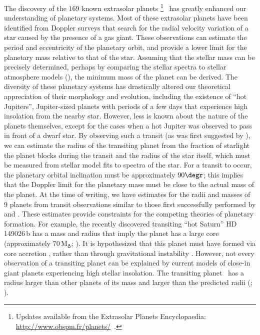 The discovery of the $169$ known extrasolar planets%
\footnote{Updates available from the 
Extrasolar Planets Encyclopaedia:\\
\url{http://www.obspm.fr/planets/}\ .}%
\ has greatly enhanced our
understanding of planetary systems. Most of these extrasolar planets
have been identified from Doppler surveys that search for the radial
velocity variation of a star caused by the presence of a gas giant.
These observations can estimate the period and eccentricity of the
planetary orbit, and provide a lower limit for the planetary mass
relative to that of the star. Assuming that the stellar mass can be
precisely determined, perhaps by comparing the stellar spectra to
stellar atmosphere models (\citealp[such as][]{Kurucz:ATLAS9:1993a}),
the minimum mass of the planet can be derived.  The diversity of these
planetary systems has drastically altered our theoretical appreciation
of their morphology and evolution, including the existence of ``hot
Jupiters'', Jupiter-sized planets with periods of a few days that
experience high insolation from the nearby star.  However, less is
known about the nature of the planets themselves, except for the cases
when a hot Jupiter was observed to pass in front of a dwarf star. By
observing such a transit (as was first suggested by
\citealt{Struve:obs:1952a}), we can estimate the radius of the
transiting planet from the fraction of starlight the planet blocks
during the transit and the radius of the star itself, which must be
measured from stellar model fits to spectra of the star. For a transit
to occur, the planetary orbital inclination must be approximately
$90\degr$; this implies that the Doppler limit for the planetary
mass must be close to the actual mass of the planet. At the 
time of writing, we have estimates for the radii and masses of 9 planets from transit
observations similar to those first successfully performed by
\citet{Charbonneau_Brown_Latham:apjl:2000a} and
\citet{Henry_Marcy_Butler:apj:2000a}. These estimates provide
constraints for the competing theories of planetary formation. For
example, the recently discovered transiting ``hot Saturn''
\mbox{HD\,149026\,b} has a mass and radius that imply the
planet has a large core (approximately $70\,\mathrm{M}_{\earth}$;
\citealt{Sato_Fischer_Henry:apj:2005a, Charbonneau_Winn_Latham:apj:2006a}).
It is hypothesized that this planet must have formed via core
accretion \citep{Pollack:araa:1984a, Pollack_Hubickyj_Bodenheimer:icarus:1996a},
rather than through gravitational instability \citep{Boss:sc:1997a}.
However, not every observation of a transiting planet can be explained
by current models of close-in giant planets experiencing high stellar
insolation. The transiting planet \hdTZNb\ has a radius larger than
other planets of its mass and larger than the predicted radii
(\citealp[see][ and references
therein]{Laughlin_Wolf_Vanmunster:apj:2005a};
\citealt{Deming_Seager_Richardson:nat:2005a}).

